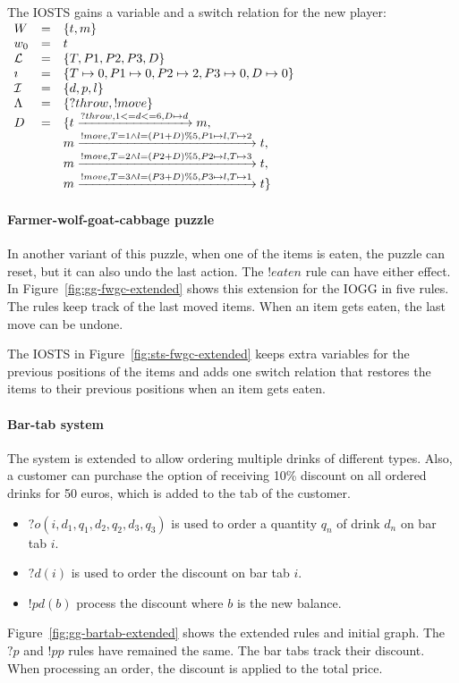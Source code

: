 The IOSTS gains a variable and a switch relation for the new player:
\vspace{5px} \\
$\begin{array}{lcl}
W & = & \{t, m\} \\
w_0 & = & t \\
\mathcal{L} & = & \{T, P1, P2, P3, D\} \\
\imath & = & \{T \mapsto 0, P1 \mapsto 0, P2 \mapsto 2, P3 \mapsto 0, D \mapsto 0\} \\
\mathcal{I} & = & \{d, p, l\} \\
\Lambda & = & \{?throw, !move\} \\
D & = & \{t\xrightarrow{?throw, 1 <= d <= 6, D \mapsto d}m, \\
 & & m\xrightarrow{!move, T=1 \land l=(P1+D)\%5, P1 \mapsto l, T \mapsto 2}t, \\
 & & m\xrightarrow{!move, T=2 \land l=(P2+D)\%5, P2 \mapsto l, T \mapsto 3}t, \\
 & & m\xrightarrow{!move, T=3 \land l=(P3+D)\%5, P3 \mapsto l, T \mapsto 1}t\}
\end{array}$

\paragraph*{Farmer-wolf-goat-cabbage puzzle}
In another variant of this puzzle, when one of the items is eaten, the puzzle can reset, but it can also undo the last action. The $\mathit{!eaten}$ rule can have either effect. In Figure~\ref{fig:gg-fwgc-extended} shows this extension for the IOGG in five rules. The rules keep track of the last moved items. When an item gets eaten, the last move can be undone.

The IOSTS in Figure~\ref{fig:sts-fwgc-extended} keeps extra variables for the previous positions of the items and adds one switch relation that restores the items to their previous positions when an item gets eaten.

\paragraph*{Bar-tab system}
The system is extended to allow ordering multiple drinks of different types. Also, a customer can purchase the option of receiving 10\% discount on all ordered drinks for 50 euros, which is added to the tab of the customer.
\vspace{5px}
\begin{itemize}
\item $?o(i,d_1,q_1,d_2,q_2,d_3,q_3)$ is used to order a quantity $q_n$ of drink $d_n$ on bar tab $i$. 
\item $?d(i)$ is used to order the discount on bar tab $i$.
\item $!pd(b)$ process the discount where $b$ is the new balance. 
\end{itemize}
\vspace{5px}
Figure~\ref{fig:gg-bartab-extended} shows the extended rules and initial graph. The $?p$ and $!pp$ rules have remained the same. The bar tabs track their discount. When processing an order, the discount is applied to the total price.

